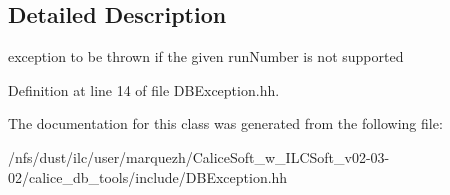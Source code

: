 \subsection{Detailed Description}
exception to be thrown if the given run\-Number is not supported 

Definition at line 14 of file D\-B\-Exception.\-hh.



The documentation for this class was generated from the following file\-:\begin{DoxyCompactItemize}
\item 
/nfs/dust/ilc/user/marquezh/\-Calice\-Soft\-\_\-w\-\_\-\-I\-L\-C\-Soft\-\_\-v02-\/03-\/02/calice\-\_\-db\-\_\-tools/include/D\-B\-Exception.\-hh\end{DoxyCompactItemize}
